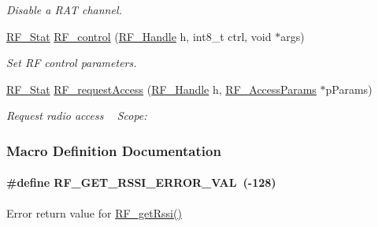 \begin{DoxyCompactItemize}
\begin{DoxyCompactList}\small\item\em Disable a R\+A\+T channel. \end{DoxyCompactList}\item 
\hyperlink{_r_f_8h_afdc219ddabc8427ecd552a6c78d9988f}{R\+F\+\_\+\+Stat} \hyperlink{_r_f_8h_aa31772d56afb197fd812d24aa6f07f1b}{R\+F\+\_\+control} (\hyperlink{_r_f_8h_a5e8ab7fc87fb818f435d9b6226ee573f}{R\+F\+\_\+\+Handle} h, int8\+\_\+t ctrl, void $\ast$args)
\begin{DoxyCompactList}\small\item\em Set R\+F control parameters. \end{DoxyCompactList}\item 
\hyperlink{_r_f_8h_afdc219ddabc8427ecd552a6c78d9988f}{R\+F\+\_\+\+Stat} \hyperlink{_r_f_8h_a40a5506c05a11a3cd9d379cedad5b5d0}{R\+F\+\_\+request\+Access} (\hyperlink{_r_f_8h_a5e8ab7fc87fb818f435d9b6226ee573f}{R\+F\+\_\+\+Handle} h, \hyperlink{struct_r_f___access_params}{R\+F\+\_\+\+Access\+Params} $\ast$p\+Params)
\begin{DoxyCompactList}\small\item\em Request radio access ~\newline
 Scope\+: \end{DoxyCompactList}\end{DoxyCompactItemize}


\subsubsection{Macro Definition Documentation}
\paragraph[{R\+F\+\_\+\+G\+E\+T\+\_\+\+R\+S\+S\+I\+\_\+\+E\+R\+R\+O\+R\+\_\+\+V\+A\+L}]{\setlength{\rightskip}{0pt plus 5cm}\#define R\+F\+\_\+\+G\+E\+T\+\_\+\+R\+S\+S\+I\+\_\+\+E\+R\+R\+O\+R\+\_\+\+V\+A\+L~(-\/128)}\label{_r_f_8h_a40e933adc8b5b1c03133451361c5505b}


Error return value for \hyperlink{_r_f_8h_ac3fe0d39243fb6bbefe0216d958a6779}{R\+F\+\_\+get\+Rssi()} 

